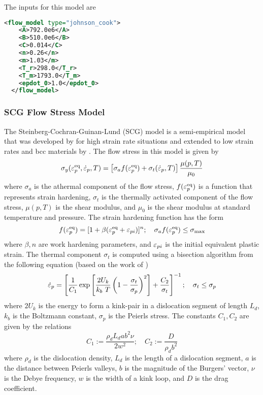   The inputs for this model are
  \begin{lstlisting}[language=XML]
  <flow_model type="johnson_cook">
    <A>792.0e6</A>
    <B>510.0e6</B>
    <C>0.014</C>
    <n>0.26</n>
    <m>1.03</m>
    <T_r>298.0</T_r>
    <T_m>1793.0</T_m>
    <epdot_0>1.0</epdot_0>
  </flow_model>
  \end{lstlisting}

  \subsubsection{SCG Flow Stress Model}
  The Steinberg-Cochran-Guinan-Lund (SCG) model is a semi-empirical model
  that was developed by \cite{Steinberg1980} for high strain rate
  situations and extended to low strain rates and bcc materials by
  \cite{Steinberg1989}.  The flow stress in this model is given by
  \begin{equation}\label{eq:SCGL}
    \sigma_y(\varepsilon_p^\text{eq},\dot{\varepsilon}_{p},T) = 
     \left[\sigma_a f(\varepsilon_p^\text{eq}) + \sigma_t (\dot{\varepsilon}_{p}, T)\right]
     \frac{\mu(p,T)}{\mu_0} 
  \end{equation}
  where $\sigma_a$ is the athermal component of the flow stress,
  $f(\varepsilon_p^\text{eq})$ is a function that represents strain hardening,
  $\sigma_t$ is the thermally activated component of the flow stress,
  $\mu(p,T)$ is the shear modulus, and $\mu_0$ is the shear modulus
  at standard temperature and pressure.  The strain hardening function
  has the form
  \begin{equation}
    f(\varepsilon_p^\text{eq}) = [1 + \beta(\varepsilon_p^\text{eq} + \varepsilon_{pi})]^n ; \quad
    \sigma_a f(\varepsilon_p^\text{eq}) \le \sigma_{\text{max}}
  \end{equation}
  where $\beta, n$ are work hardening parameters, and $\varepsilon_{pi}$ is the
  initial equivalent plastic strain.  The thermal component $\sigma_t$
  is computed using a bisection algorithm from the following equation (based
  on the work of \cite{Hoge1977})
  \begin{equation}
    \dot{\varepsilon}_{p} = \left[\frac{1}{C_1}\exp\left[\frac{2U_k}{k_b~T}
      \left(1 - \frac{\sigma_t}{\sigma_p}\right)^2\right] + 
      \frac{C_2}{\sigma_t}\right]^{-1}; \quad
    \sigma_t \le \sigma_p
  \end{equation}
  where $2 U_k$ is the energy to form a kink-pair in a dislocation segment
  of length $L_d$, $k_b$ is the Boltzmann constant, $\sigma_p$ is the Peierls
  stress. The constants $C_1, C_2$ are given by the relations
  \begin{equation}
    C_1 := \frac{\rho_d L_d a b^2 \nu}{2 w^2}; \quad
    C_2 := \frac{D}{\rho_d b^2}
  \end{equation}
  where $\rho_d$ is the dislocation density, $L_d$ is the length of a
  dislocation segment, $a$ is the distance between Peierls valleys,
  $b$ is the magnitude of the Burgers' vector, $\nu$ is the Debye frequency,
  $w$ is the width of a kink loop, and $D$ is the drag coefficient.

